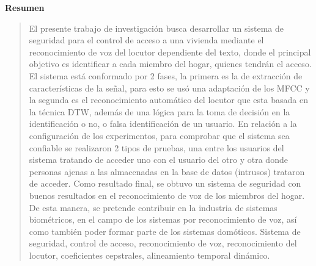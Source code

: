 %

%


\newpage
\begin{center}
 {\bf\LARGE Resumen}
\end{center} 
\begin{quotation}
El presente trabajo de investigación busca desarrollar un sistema de seguridad para el control de acceso a una vivienda mediante el reconocimiento de voz del locutor dependiente del texto, donde el principal objetivo es identificar a cada miembro del hogar, quienes tendrán el acceso.
\vskip 0.1cm
El sistema está conformado por 2 fases, la primera es la de extracción de características de la señal, para esto se usó una adaptación de los MFCC y la segunda es el reconocimiento automático del locutor que esta basada en la técnica DTW, además de una lógica para la toma de decisión en la identificación o no, o falsa identificación de un usuario. En relación a la configuración de los experimentos, para comprobar que el sistema sea confiable se realizaron 2 tipos de pruebas, una entre los usuarios del sistema tratando de acceder uno con el usuario del otro y otra donde personas ajenas a las almacenadas en la base de datos (intrusos) trataron de acceder.
\vskip 0.1cm
Como resultado final, se obtuvo un sistema de seguridad con buenos resultados en el reconocimiento de voz de los miembros del hogar. De esta manera, se pretende contribuir en la industria de sistemas biométricos, en el campo de los sistemas por reconocimiento de voz, así como también poder formar parte de los sistemas domóticos.
\vskip 0.1cm
\hspace*{-0.6cm}{\bf Palabras claves:} Sistema de seguridad, control de acceso, reconocimiento de voz, reconocimiento del locutor, coeficientes cepstrales, alineamiento temporal dinámico.
\end{quotation}


